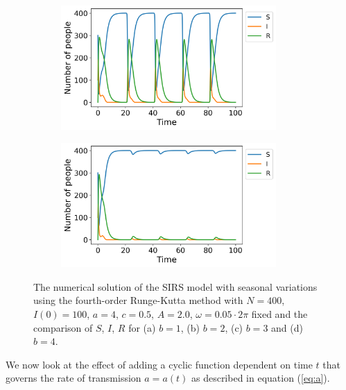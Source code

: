 \documentclass[../main.tex]{subfiles}
\begin{document}
\begin{figure}[htb!]
    \begin{subfigure}[b]{0.475\textwidth}
    \centering
    \includegraphics[width=0.9\textwidth]{../figures/SIRS_harmonical_rk4_b=3.png}
    \caption{}
    \label{fig:seasonal_b=3}
    \end{subfigure}
    \quad
    \begin{subfigure}[b]{0.475\textwidth}
    \includegraphics[width=0.9\textwidth]{../figures/SIRS_harmonical_rk4_b=4.png}
    \caption{}
    \label{fig:seasonal_b=4}
    \end{subfigure}
    \caption{The numerical solution of the SIRS model with seasonal variations using the fourth-order Runge-Kutta method with $N=400$, $I(0)=100$, $a=4$, $c=0.5$, $A=2.0$, $\omega=0.05\cdot2\pi$ fixed and the comparison of $S$, $I$, $R$ for (a)  $b=1$, (b) $b=2$, (c) $b=3$ and (d) $b=4$.}
    \label{fig:SIRS_rk4_seasonal}
\end{figure}
\fi

We now look at the effect of adding a cyclic function dependent on time $t$ that governs the rate of transmission $a = a(t)$ as described in equation (\ref{eq:a}).  
\end{document}
